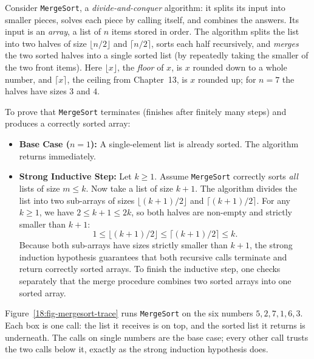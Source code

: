 Consider \texttt{MergeSort}, a \emph{divide-and-conquer} algorithm: it splits its input into smaller pieces, solves each piece by calling itself, and combines the answers. Its input is an \emph{array}, a list of $n$ items stored in order. The algorithm splits the list into two halves of size $\lfloor n/2 \rfloor$ and $\lceil n/2 \rceil$, sorts each half recursively, and \emph{merges} the two sorted halves into a single sorted list (by repeatedly taking the smaller of the two front items). Here $\lfloor x \rfloor$, the \emph{floor} of $x$, is $x$ rounded down to a whole number, and $\lceil x \rceil$, the ceiling from Chapter~13, is $x$ rounded up; for $n = 7$ the halves have sizes $3$ and $4$.

To prove that \texttt{MergeSort} terminates (finishes after finitely many steps) and produces a correctly sorted array:
\begin{itemize}
\item \textbf{Base Case ($n = 1$):} A single-element list is already sorted. The algorithm returns immediately.
\item \textbf{Strong Inductive Step:} Let $k \ge 1$. Assume \texttt{MergeSort} correctly sorts \emph{all} lists of size $m \le k$. Now take a list of size $k+1$. 
The algorithm divides the list into two sub-arrays of sizes $\lfloor (k+1)/2 \rfloor$ and $\lceil (k+1)/2 \rceil$. 
For any $k \ge 1$, we have $2 \le k + 1 \le 2k$, so both halves are non-empty and strictly smaller than $k + 1$:
\[
1 \le \lfloor (k+1)/2 \rfloor \le \lceil (k+1)/2 \rceil \le k.
\]
Because both sub-arrays have sizes strictly smaller than $k+1$, the strong induction hypothesis guarantees that both recursive calls terminate and return correctly sorted arrays.
To finish the inductive step, one checks separately that the merge procedure combines two sorted arrays into one sorted array.
\end{itemize}

Figure~\ref{18:fig-mergesort-trace} runs \texttt{MergeSort} on the six numbers $5, 2, 7, 1, 6, 3$. Each box is one call: the list it receives is on top, and the sorted list it returns is underneath. The calls on single numbers are the base case; every other call trusts the two calls below it, exactly as the strong induction hypothesis does.

